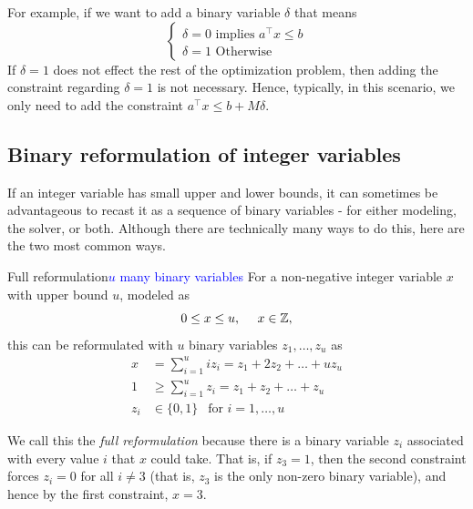 For example, if we want to add a binary variable $\delta$ that means
$$
\begin{cases}
\delta = 0 \text{ implies }  a^\top x \leq b\\
\delta = 1  \text{ Otherwise}
\end{cases}
$$
If $\delta = 1$ does not effect the rest of the optimization problem, then adding the constraint regarding $\delta = 1$ is not necessary.  Hence, typically, in this scenario, we only need to add the constraint $a^\top x \leq b + M \delta$.

\subsection{Binary reformulation of integer variables}
If an integer variable has small upper and lower bounds, it can sometimes be advantageous to recast it as a sequence of binary variables - for either modeling, the solver, or both.   Although there are technically many ways to do this, here are the two most common ways.

\begin{general}{Full reformulation}{\textcolor{blue}{$u$ many binary variables}}
\label{general:full-reformulation}
For a non-negative integer variable $x$ with upper bound $u$, modeled as 
\begin{equation}
0 \leq x \leq u, \ \ \ \ x \in {\mathbb{Z}},
\end{equation}
this can be reformulated with $u$ binary variables $z_1, \dots, z_u$ as 
\begin{equation}
\begin{split}
x & = \sum_{i=1}^u i z_i = z_1 + 2 z_2 + \dots + u z_u\\
1 & \geq \sum_{i=1}^u z_i = z_1 + z_2 + \dots + z_u\\
z_i & \in \{0,1\} \ \ \text{ for } i=1, \dots, u
\end{split}
\end{equation}
\end{general}
We call this the \emph{full reformulation} because there is a binary variable $z_i$ associated with every value $i$ that $x$ could take.  That is, if $z_3 = 1$, then the second constraint forces $z_i = 0$ for all $i \neq 3$ (that is, $z_3$ is the only non-zero binary variable), and hence by the first constraint, $x = 3$.


